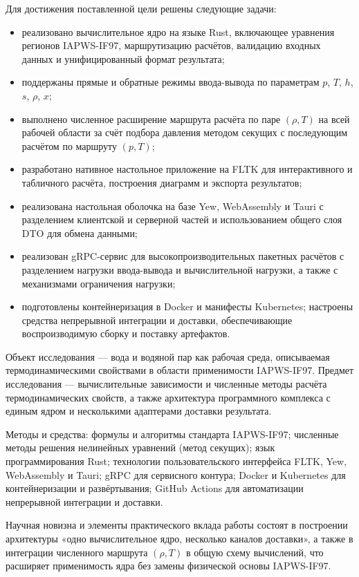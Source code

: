 Для достижения поставленной цели решены следующие задачи:
\begin{itemize}
\item реализовано вычислительное ядро на языке Rust, включающее уравнения регионов IAPWS-IF97, маршрутизацию расчётов, валидацию входных данных и унифицированный формат результата;
\item поддержаны прямые и обратные режимы ввода-вывода по параметрам $p$, $T$, $h$, $s$, $\rho$, $x$;
\item выполнено численное расширение маршрута расчёта по паре $(\rho, T)$ на всей рабочей области за счёт подбора давления методом секущих с последующим расчётом по маршруту $(p, T)$;
\item разработано нативное настольное приложение на FLTK для интерактивного и табличного расчёта, построения диаграмм и экспорта результатов;
\item реализована настольная оболочка на базе Yew, WebAssembly и Tauri
с разделением клиентской и серверной частей
и использованием общего слоя DTO для обмена данными;
\item реализован gRPC-сервис для высокопроизводительных пакетных расчётов с разделением нагрузки ввода-вывода и вычислительной нагрузки, а также с механизмами ограничения нагрузки;
\item подготовлены контейнеризация в Docker и манифесты Kubernetes; настроены средства непрерывной интеграции и доставки, обеспечивающие воспроизводимую сборку и поставку артефактов.
\end{itemize}

Объект исследования --- вода и водяной пар как рабочая среда, описываемая термодинамическими свойствами в области применимости IAPWS-IF97.
Предмет исследования --- вычислительные зависимости и численные методы расчёта термодинамических свойств, а также архитектура программного комплекса с единым ядром и несколькими адаптерами доставки результата.

Методы и средства: формулы и алгоритмы стандарта IAPWS-IF97;
численные методы решения нелинейных уравнений (метод секущих);
язык программирования Rust;
технологии пользовательского интерфейса FLTK, Yew, WebAssembly и Tauri;
gRPC для сервисного контура;
Docker и Kubernetes для контейнеризации и развёртывания;
GitHub Actions для автоматизации непрерывной интеграции и доставки.

Научная новизна и элементы практического вклада работы состоят в построении
архитектуры «одно вычислительное ядро, несколько каналов доставки», а также в
интеграции численного маршрута $(\rho, T)$ в общую схему вычислений, что расширяет
применимость ядра без замены физической основы IAPWS-IF97.

